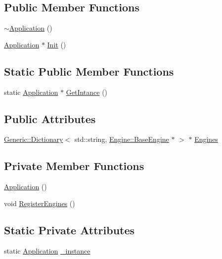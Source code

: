 \subsection*{Public Member Functions}
\begin{DoxyCompactItemize}
\item 
\mbox{\hyperlink{classApplication_1_1Application_aeef3ff221435f74e41115640239e6f34}{$\sim$\+Application}} ()
\item 
\mbox{\hyperlink{classApplication_1_1Application}{Application}} $\ast$ \mbox{\hyperlink{classApplication_1_1Application_a478f6946c4bf5361281681f2b58385c3}{Init}} ()
\end{DoxyCompactItemize}
\subsection*{Static Public Member Functions}
\begin{DoxyCompactItemize}
\item 
static \mbox{\hyperlink{classApplication_1_1Application}{Application}} $\ast$ \mbox{\hyperlink{classApplication_1_1Application_ada268208f57ef136e006bb62fb30ffec}{Get\+Intance}} ()
\end{DoxyCompactItemize}
\subsection*{Public Attributes}
\begin{DoxyCompactItemize}
\item 
\mbox{\hyperlink{classGeneric_1_1Dictionary}{Generic\+::\+Dictionary}}$<$ std\+::string, \mbox{\hyperlink{classEngine_1_1BaseEngine}{Engine\+::\+Base\+Engine}} $\ast$ $>$ $\ast$ \mbox{\hyperlink{classApplication_1_1Application_a4f2808bddfc3f8fb2ed3a3fe0d4659ff}{Engines}}
\end{DoxyCompactItemize}
\subsection*{Private Member Functions}
\begin{DoxyCompactItemize}
\item 
\mbox{\hyperlink{classApplication_1_1Application_aa27a092cca399b3ccee7419a7cda4563}{Application}} ()
\item 
void \mbox{\hyperlink{classApplication_1_1Application_a877f88238e07698fb9fcc0b71e9f15e7}{Register\+Engines}} ()
\end{DoxyCompactItemize}
\subsection*{Static Private Attributes}
\begin{DoxyCompactItemize}
\item 
static \mbox{\hyperlink{classApplication_1_1Application}{Application}} \mbox{\hyperlink{classApplication_1_1Application_abd6690c71308921648b3b4da20d604d9}{\+\_\+instance}}
\end{DoxyCompactItemize}


